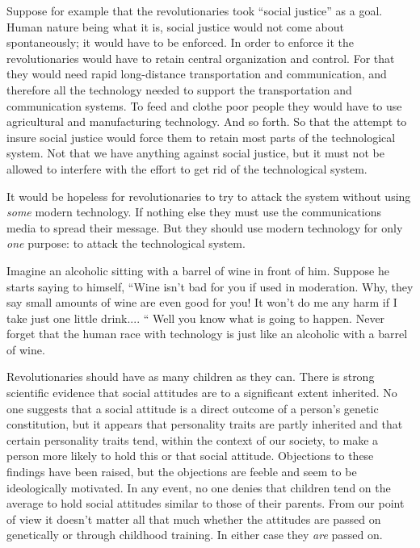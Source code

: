  Suppose for example that the revolutionaries took “social justice” as a goal. Human nature being what it is, social justice would not come about spontaneously; it would have to be enforced. In order to enforce it the revolutionaries would have to retain central organization and control. For that they would need rapid long-distance transportation and communication, and therefore all the technology needed to support the transportation and communication systems. To feed and clothe poor people they would have to use agricultural and manufacturing technology. And so forth. So that the attempt to insure social justice would force them to retain most parts of the technological system. Not that we have anything against social justice, but it must not be allowed to interfere with the effort to get rid of the technological system.

 It would be hopeless for revolutionaries to try to attack the system without using {\em some} modern technology. If nothing else they must use the communications media to spread their message. But they should use modern technology for only {\em one} purpose: to attack the technological system.

 Imagine an alcoholic sitting with a barrel of wine in front of him. Suppose he starts saying to himself, “Wine isn’t bad for you if used in moderation. Why, they say small amounts of wine are even good for you! It won’t do me any harm if I take just one little drink.... “ Well you know what is going to happen. Never forget that the human race with technology is just like an alcoholic with a barrel of wine.

 Revolutionaries should have as many children as they can. There is strong scientific evidence that social attitudes are to a significant extent inherited. No one suggests that a social attitude is a direct outcome of a person’s genetic constitution, but it appears that personality traits are partly inherited and that certain personality traits tend, within the context of our society, to make a person more likely to hold this or that social attitude. Objections to these findings have been raised, but the objections are feeble and seem to be ideologically motivated. In any event, no one denies that children tend on the average to hold social attitudes similar to those of their parents. From our point of view it doesn’t matter all that much whether the attitudes are passed on genetically or through childhood training. In either case they {\em are} passed on.

